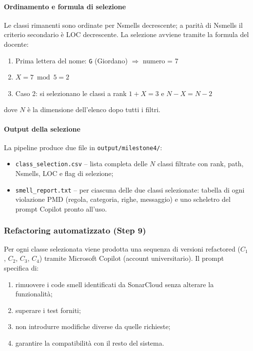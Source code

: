 \paragraph{Ordinamento e formula di selezione}

Le classi rimanenti sono ordinate per Nsmells decrescente; a parità di Nsmells il
criterio secondario è LOC decrescente. La selezione avviene tramite la formula del
docente:

\begin{enumerate}
  \item Prima lettera del nome: \texttt{G} (Giordano) $\Rightarrow$ numero = 7
  \item $X = 7 \bmod 5 = 2$
  \item Caso 2: si selezionano le classi a rank $1{+}X = 3$ e $N{-}X = N{-}2$
\end{enumerate}

dove $N$ è la dimensione dell'elenco dopo tutti i filtri.

\paragraph{Output della selezione}

La pipeline produce due file in \texttt{output/milestone4/}:
\begin{itemize}
  \item \texttt{class\_selection.csv} -- lista completa delle $N$ classi filtrate con
        rank, path, Nsmells, LOC e flag di selezione;
  \item \texttt{smell\_report.txt} -- per ciascuna delle due classi selezionate: tabella
        di ogni violazione PMD (regola, categoria, righe, messaggio) e uno scheletro
        del prompt Copilot pronto all'uso.
\end{itemize}

\subsubsection{Refactoring automatizzato (Step 9)}

Per ogni classe selezionata viene prodotta una sequenza di versioni refactored
($C_1$, $C_2$, $C_3$, $C_4$) tramite Microsoft Copilot (account universitario).
Il prompt specifica di:

\begin{enumerate}
  \item rimuovere i code smell identificati da SonarCloud senza alterare la funzionalità;
  \item superare i test forniti;
  \item non introdurre modifiche diverse da quelle richieste;
  \item garantire la compatibilità con il resto del sistema.
\end{enumerate}

